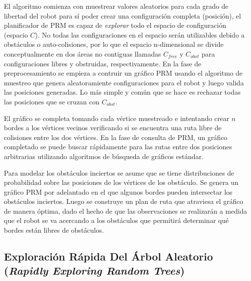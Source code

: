 El algoritmo comienza con muestrear valores aleatorios para cada grado de 
libertad del robot para s\'i poder crear una configuraci\'on completa 
(posici\'on), el planificador de PRM es capaz de \textit{explorar} todo 
el espacio de configuraci\'on (espacio $C$). No todas las configuraciones 
en el espacio ser\'an utilizables debido a obst\'aculos o auto-colisiones, 
por lo que el espacio n-dimensional se divide conceptualmente en dos \'areas 
no contiguas llamadas $C_{free}$ y $C_{obst}$ para configuraciones libres y 
obstruidas, respectivamente. En la fase de preprocesamiento se empieza a 
contruir un gr\'afico PRM usando el algoritmo de muestreo que genera 
aleatoramiente configuraciones para el robot y luego valida las 
posiciones generadas. Lo m\'as simple y com\'un que se hace es rechazar 
todas las posiciones que se cruzan con $C_{obst}$. 

El gr\'afico se completa tomando cada v\'ertice muestreado e intentando 
crear $n$ bordes a los v\'ertices vecinos verificando si se encuentra una 
ruta libre de colisiones entre los dos v\'ertices. En la fase de consulta 
de PRM, un gr\'afico completado se puede buscar r\'apidamente para las 
rutas entre dos posiciones arbitrarias utilizando algoritmos de 
b\'usqueda de gr\'aficos est\'andar.

Para modelar los obst\'aculos inciertos se asume que se tiene distribuciones 
de probabilidad sobre las posiciones de los v\'ertices de los obst\'aculo. Se 
genera un gr\'afico PRM por adelantado en el que algunos bordes pueden 
intersectar los obst\'aculos inciertos. Luego se construye un plan de 
ruta que atraviesa el gr\'afico de manera \'optima, dado el hecho de 
que las observaciones se realizar\'an a medida que el robot se va acercando a 
los obst\'aculos que permitir\'a determinar qu\'e bordes est\'an 
libres de obst\'aculos.

\subsection{Exploraci\'on R\'apida Del \'Arbol Aleatorio (\textit{Rapidly Exploring Random Trees})}



